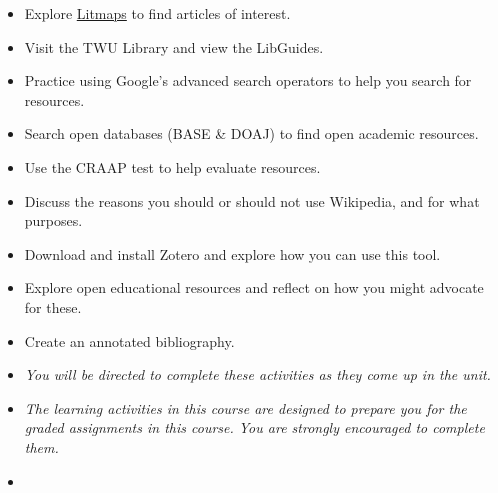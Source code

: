 \documentclass[
  letterpaper,
  DIV=11,
  numbers=noendperiod]{scrreprt}
\providecommand{\tightlist}{%
  \setlength{\itemsep}{0pt}\setlength{\parskip}{0pt}}\usepackage{longtable,booktabs,array}
\begin{document}
\begin{tcolorbox}[enhanced jigsaw, toprule=.15mm, colback=white, colframe=quarto-callout-note-color-frame, bottomtitle=1mm, leftrule=.75mm, coltitle=black, titlerule=0mm, rightrule=.15mm, colbacktitle=quarto-callout-note-color!10!white, left=2mm, title={Learning Activity}, opacitybacktitle=0.6, opacityback=0, breakable, toptitle=1mm, arc=.35mm, bottomrule=.15mm]

\begin{itemize}
\tightlist
\item
  Explore \href{https://litmaps.com}{Litmaps} to find articles of
  interest.
\item
  Visit the TWU Library and view the LibGuides.
\item
  Practice using Google's advanced search operators to help you search
  for resources.
\item
  Search open databases (BASE \& DOAJ) to find open academic resources.
\item
  Use the CRAAP test to help evaluate resources.
\item
  Discuss the reasons you should or should not use Wikipedia, and for
  what purposes.
\item
  Download and install Zotero and explore how you can use this tool.
\item
  Explore open educational resources and reflect on how you might
  advocate for these.
\item
  Create an annotated bibliography.
\end{itemize}

\begin{tcolorbox}[enhanced jigsaw, toprule=.15mm, colback=white, colframe=quarto-callout-note-color-frame, arc=.35mm, opacityback=0, breakable, rightrule=.15mm, bottomrule=.15mm, leftrule=.75mm, left=2mm]

\begin{itemize}
\tightlist
\item
  \emph{You will be directed to complete these activities as they come
  up in the unit.}
\item
  \emph{The learning activities in this course are designed to prepare
  you for the graded assignments in this course. You are strongly
  encouraged to complete them.}
\item
\end{itemize}

\end{tcolorbox}

\end{tcolorbox}
\end{document}
